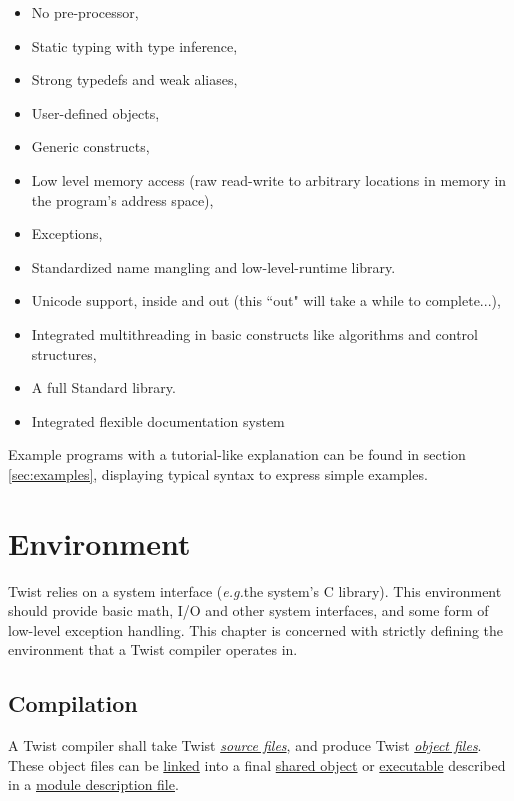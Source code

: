 \documentclass[a4paper,11pt]{report}
\newcommand{\eg}{\textit{e.g.}}
\begin{document}
\begin{itemize}
  \item No pre-processor,
  \item Static typing with type inference,
  \item Strong typedefs and weak aliases,
  \item User-defined objects,
  \item Generic constructs,
  \item Low level memory access (raw read-write to arbitrary locations in memory in the program's address space),
  \item Exceptions,
  \item Standardized name mangling and low-level-runtime library.
  \item Unicode support, inside and out (this ``out" will take a while to complete...),
  \item Integrated multithreading in basic constructs like algorithms and control structures,
  \item A full Standard library.
  \item Integrated flexible documentation system
\end{itemize}
Example programs with a tutorial-like explanation can be found in section \ref{sec:examples}, displaying typical syntax to express simple examples.

\chapter{Environment}

Twist relies on a system interface (\eg the system's C library).
This environment should provide basic math, I/O and other system interfaces, and some form of low-level exception handling.
This chapter is concerned with strictly defining the environment that a Twist compiler operates in.

\section{Compilation}

A Twist compiler shall take Twist \hyperref[sec:source_files]{\emph{source files}}, and produce Twist \hyperref[sec:object_files]{\emph{object files}}.
These object files can be \hyperref[sec:linking]{linked} into a final \hyperref[sec:shared_objects]{shared object} or \hyperref[sec:executables]{executable} described in a \hyperref[sec:module_description_files]{module description file}.
\end{document}
